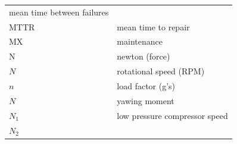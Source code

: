 \documentclass[
]{book}
\begin{document}
\begin{longtable}[]{@{}ll@{}}
\begin{minipage}[t]{0.47\columnwidth}
mean time between failures\strut
\end{minipage}\tabularnewline
\begin{minipage}[t]{0.47\columnwidth}\raggedright
MTTR\strut
\end{minipage} & \begin{minipage}[t]{0.47\columnwidth}\raggedright
mean time to repair\strut
\end{minipage}\tabularnewline
\begin{minipage}[t]{0.47\columnwidth}\raggedright
MX\strut
\end{minipage} & \begin{minipage}[t]{0.47\columnwidth}\raggedright
maintenance\strut
\end{minipage}\tabularnewline
\begin{minipage}[t]{0.47\columnwidth}\raggedright
N\strut
\end{minipage} & \begin{minipage}[t]{0.47\columnwidth}\raggedright
newton (force)\strut
\end{minipage}\tabularnewline
\begin{minipage}[t]{0.47\columnwidth}\raggedright
\(N\)\strut
\end{minipage} & \begin{minipage}[t]{0.47\columnwidth}\raggedright
rotational speed (RPM)\strut
\end{minipage}\tabularnewline
\begin{minipage}[t]{0.47\columnwidth}\raggedright
\(n\)\strut
\end{minipage} & \begin{minipage}[t]{0.47\columnwidth}\raggedright
load factor (g's)\strut
\end{minipage}\tabularnewline
\begin{minipage}[t]{0.47\columnwidth}\raggedright
\(N\)\strut
\end{minipage} & \begin{minipage}[t]{0.47\columnwidth}\raggedright
yawing moment\strut
\end{minipage}\tabularnewline
\begin{minipage}[t]{0.47\columnwidth}\raggedright
\(N_1\)\strut
\end{minipage} & \begin{minipage}[t]{0.47\columnwidth}\raggedright
low pressure compressor speed\strut
\end{minipage}\tabularnewline
\begin{minipage}[t]{0.47\columnwidth}\raggedright
\(N_2\)\strut

\end{minipage}
\end{longtable}
\end{document}
